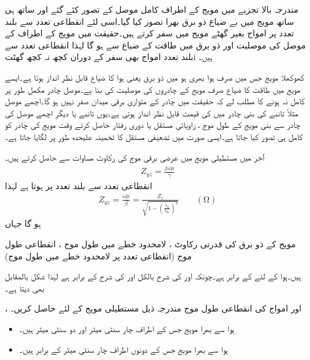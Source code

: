 مندرجہ بالا تجزیے میں مویج کے اطراف کامل موصل کے تصور کئے گئے اور ساتھ ہی ساتھ مویج میں بے ضیاع ذو برق بھرا تصور کیا گیا۔اسی لئے انقطاعی تعدد سے بلند تعدد پر امواج بغیر گھٹے مویج میں سفر کرتے ہیں۔حقیقت میں مویج کے اطراف کے موصل کی موصلیت اور ذو برق میں طاقت کے ضیاع سے   ہو گا لہٰذا انقطاعی تعدد سے بلند تعدد  امواج بھی سفر کے دوران کچھ نہ کچھ گھٹتi ہیں۔

کھوکھلا مویج جس میں صرف ہوا بھری ہو میں ذو برق یعنی ہوا کا ضیاع  قابل نظر انداز ہوتا ہے۔ایسے مویج میں طاقت کا ضیاع صرف مویج کے چادروں کی موصلیت کی بنا ہے۔موصل چادر مکمل طور پر کامل نہ ہونے کا مطلب لے کہ حقیقت میں چادر کے متوازی برقی میدان  صفر نہیں ہو گا۔اچھے موصل مثلاً تانبے کی بنی چادر میں  کی قیمت قابل نظر انداز ہوتی ہے۔یوں تانبے یا دیگر اچھے موصل کی چادر سے بنی مویج کے طول موج ، زاویائی مستقل  یا دوری رفتار  حاصل کرتے وقت مویج کی چادر کو کامل ہی تصور کیا جاتا ہے۔ایسی صورت میں تضعیفی مستقل  کا تخمینہ  علیحدہ طور پر لگایا جاتا ہے۔

آخر میں مستطیلی مویج میں عرضی برقی موج کی رکاوٹ  مساوات  سے حاصل کرتے ہیں۔
\begin{align}
Z_{yz}=\frac{j\omega \mu}{\gamma}
\end{align} 
انقطاعی تعدد سے بلند تعدد پر  ہوتا ہے لہٰذا
\begin{align}\label{مساوات_مویج_عرضی_برقی_رکاوٹ_حتمی}
Z_{yz}=\frac{\omega \mu}{\beta}=\frac{Z_z}{\sqrt{1-\left(\frac{\lambda_0}{\lambda_{0c}}\right)^2}} \quad \quad (\si{\ohm})
\end{align} 
ہو گا جہاں
\begin{description}
 مویج کے ذو برق کی قدرتی رکاوٹ ،
 لامحدود خطے میں طول موج ،
 انقطاعی طول موج (انقطاعی تعدد پر لامحدود خطے میں طول موج)
\end{description}
ہیں۔ہوا کے لئے  کے برابر ہے۔چونکہ  اور  کی شرح  بالکل  اور  کی شرح کے برابر ہے لہٰذا شکل    بالمقابل  بھی دیتا ہے۔

،  اور   امواج کی انقطاعی طول موج مندرجہ ذیل مستطیلی مویج کے لئے حاصل کریں۔
\begin{itemize}
\item
ہوا سے بھرا مویج جس کے اطراف  چار سنٹی میٹر اور دو سنٹی میٹر ہیں۔
\item
ہوا سے بھرا مویج جس کے دونوں اطراف  چار سنٹی میٹر کے برابر ہیں۔
\end{itemize} 

